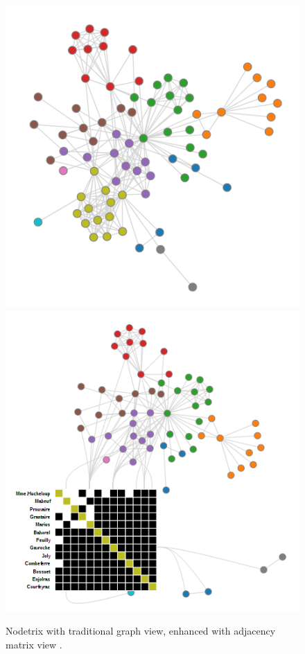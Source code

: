 \begin{figure}[h]
\centering
\includegraphics[width=\textwidth/3]{images/nodetrix_matrix}
\includegraphics[width=\textwidth/3]{images/nodetrix_cluster}
\caption{Nodetrix with traditional graph view, enhanced with adjacency matrix view \citep{henry-nodetrix-2007}. \label{fig:nodetrix_cluster}}
\end{figure}
